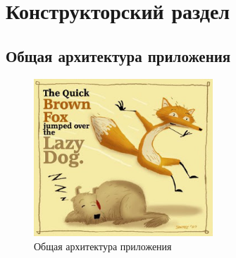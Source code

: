 \chapter{Конструкторский раздел}
\label{cha:design}
\section{Общая архитектура приложения}
\begin{figure}[h!]
	\centering
	\includegraphics[width=0.6\textwidth]{img/fox.jpg}
	\caption{Общая архитектура приложения}
	\label{fig:spire09}
\end{figure}


